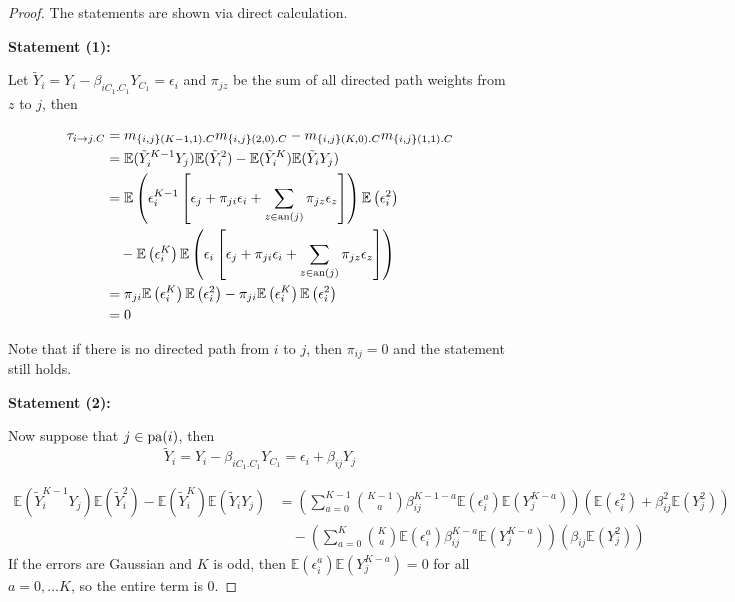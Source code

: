 \documentclass[]{article}
\newcommand{\E}{\mathbb{E}}
\newcommand{\an}{{\rm an}}       %
\newcommand{\pa}{{\rm pa}}       %
\begin{document}
\begin{proof}
The statements are shown via direct calculation.

\textbf{Statement (1):} 

Let $\tilde Y_i = Y_i - \beta_{iC_1.C_1}Y_{C_1} = \epsilon_i$ and $\pi_{jz}$ be the sum of all directed path weights from $z$ to $j$, then

\begin{equation}
\begin{aligned}
\tau _{i\rightarrow j.C} &=  m_{\{i,j\}(K-1,1).C} m_{\{i,j\}(2,0).C} - m_{\{i,j\}(K,0).C}m_{\{i,j\}(1,1).C}
\\
& = \E(\tilde Y_i^{K-1}Y_j) \E(\tilde Y_i^2) - \E(\tilde Y_i^K) \E(\tilde Y_i Y_j)
\\
&=  \E\left(\epsilon_i^{K-1} \left[\epsilon_j + \pi_{ji}\epsilon_i + \sum_{z \in \an(j)} \pi_{jz}\epsilon_z \right]\right) 
\E\left(\epsilon_i^2\right)
\\
&\quad - \E\left(\epsilon_i^K\right) \E\left(\epsilon_i  \left[\epsilon_j + \pi_{ji}\epsilon_i + \sum_{z \in \an(j)} \pi_{jz}\epsilon_z \right]\right)
\\
&=  \pi_{ji}\E\left(\epsilon_i^K \right) 
\E\left(\epsilon_i^2\right) - \pi_{ji}\E\left(\epsilon_i^K\right) \E\left(\epsilon_i^2\right)
\\
& = 0
\end{aligned}
\end{equation}

Note that if there is no directed path from $i$ to $j$, then $\pi_{ij} = 0$ and the statement still holds.

\textbf{Statement (2):}

Now suppose that $j \in \pa(i)$, then 
\[\tilde Y_i = Y_i - \beta_{iC_1.C_1}Y_{C_1} = \epsilon_i + \beta_{ij}Y_j\]

\begin{equation}
\begin{aligned}
\E(\tilde Y_i^{K-1}Y_j)\E(\tilde Y_i^2) - \E(\tilde Y_i^K)\E(\tilde Y_iY_j)
& = 
\left(\sum_{a = 0}^{K-1}{K-1 \choose a} \beta_{ij}^{K-1 - a}\E\left(\epsilon_i^a\right) \E\left(Y_j^{K-a}\right)\right) \left(\E(\epsilon_i^2)  + \beta_{ij}^2\E(Y_j^2) \right)
\\
&\quad - \left(\sum_{a = 0}^K {K \choose a} \E\left(\epsilon_i^a \right) \beta_{ij}^{K - a}\E\left(Y_j^{K - a}\right)\right)
\left(\beta_{ij}\E\left(Y_j^2\right) \right)
\end{aligned}
\end{equation}
If the errors are Gaussian and $K$ is odd, then $\E(\epsilon_i^a)\E(Y_j^{K-a}) = 0$ for all $a = 0, \ldots K$, so the entire term is 0. 


\end{proof}
\end{document}
